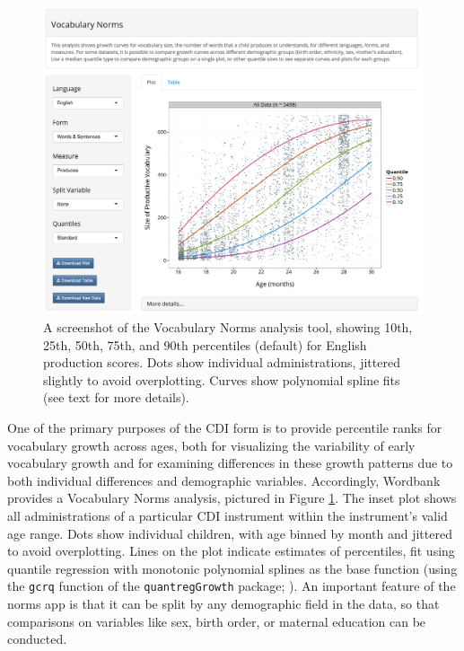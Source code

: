 \documentclass[man,noapacite]{apa}
\begin{document}
\begin{figure}[h!]
\includegraphics[width=6in]{figures/normsapp.png}
\caption{\label{fig:norms} A screenshot of the Vocabulary Norms analysis tool, showing 10th, 25th, 50th, 75th, and 90th percentiles (default) for English production scores. Dots show individual administrations, jittered slightly to avoid overplotting. Curves show polynomial spline fits (see text for more details).}
\end{figure}

One of the primary purposes of the CDI form is to provide percentile ranks for vocabulary growth across ages, both for visualizing the variability of early vocabulary growth and for examining differences in these growth patterns due to both individual differences and demographic variables. Accordingly, Wordbank provides a Vocabulary Norms analysis, pictured in Figure \ref{fig:norms}. The inset plot shows all administrations of a particular CDI instrument within the instrument's valid age range. Dots show individual children, with age binned by month and jittered to avoid overplotting. Lines on the plot indicate estimates of percentiles, fit using quantile regression with monotonic polynomial splines as the base function (using the \texttt{gcrq} function of the \texttt{quantregGrowth} package; ). An important feature of the norms app is that it can be split by any demographic field in the data, so that comparisons on variables like sex, birth order, or maternal education can be conducted. 
\end{document}
